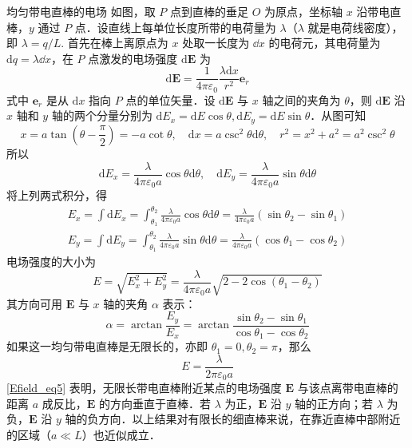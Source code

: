\begin{example}{均匀带电直棒的电场}
如图，取 $P$ 点到直棒的垂足 $O$ 为原点，坐标轴 $x$ 沿带电直棒，$y$ 通过 $P$ 点．设直线上每单位长度所带的电荷量为 $\lambda$（$\lambda$ 就是电荷线密度），即 $\lambda=q/L$. 首先在棒上离原点为 $x$ 处取一长度为 $\dd{x}$ 的电荷元，其电荷量为 $\mathrm dq=\lambda\dd{x}$，在 $P$ 点激发的电场强度 $\mathrm d\mathbf E$ 为
\begin{equation}
\mathrm{d} \mathbf{E}=\frac{1}{4 \pi \varepsilon_{0}} \frac{\lambda \mathrm{d} x}{r^{2}} \mathbf e_r
\end{equation}
式中 $\mathbf e_r$ 是从 $\mathrm dx$ 指向 $P$ 点的单位矢量．设 $\mathrm{d} \mathbf{E}$ 与 $x$ 轴之间的夹角为 $\theta$，则 $\mathrm{d} \mathbf{E}$ 沿 $x$ 轴和 $y$ 轴的两个分量分别为 $\mathrm{d} E_{x}=\mathrm{d} E \cos \theta, \mathrm{d} E_{y}=\mathrm{d} E \sin \theta$．从图可知
\begin{equation}
x=a \tan \left(\theta-\frac{\pi}{2}\right)=-a \cot \theta, \quad \mathrm{d} x=a \csc ^{2} \theta \mathrm{d} \theta, \quad r^{2}=x^{2}+a^{2}=a^{2} \csc ^{2} \theta
\end{equation}
所以
\begin{equation}
\mathrm{d} E_{x}=\frac{\lambda}{4 \pi \varepsilon_{0} a} \cos \theta \mathrm{d} \theta, \quad \mathrm{d} E_{y}=\frac{\lambda}{4 \pi \varepsilon_{0} a} \sin \theta \mathrm{d} \theta
\end{equation}
将上列两式积分，得
\begin{equation}
\begin{aligned}E_{x}=\int \mathrm{d} E_{x}=\int_{\theta_{1}}^{\theta_{2}} \frac{\lambda}{4 \pi \varepsilon_{0} a} \cos \theta \mathrm{d} \theta=\frac{\lambda}{4 \pi \varepsilon_{0} a}\left(\sin \theta_{2}-\sin \theta_{1}\right) \\ E_{y}=\int \mathrm{d} E_{y}=\int_{\theta_{1}}^{\theta_{2}} \frac{\lambda}{4 \pi \varepsilon_{0} a} \sin \theta \mathrm{d} \theta=\frac{\lambda}{4 \pi \varepsilon_{0} a}\left(\cos \theta_{1}-\cos \theta_{2}\right)\end{aligned}
\end{equation}
电场强度的大小为
\begin{equation}
E=\sqrt{E_{x}^{2}+E_{y}^{2}}=\frac{\lambda}{4 \pi \varepsilon_{0} a} \sqrt{2-2 \cos \left(\theta_{1}-\theta_{2}\right)}
\end{equation}
其方向可用 $\mathbf E$ 与 $x$ 轴的夹角 $\alpha$ 表示：
\begin{equation}
\alpha=\arctan \frac{E_{y}}{E_{x}}=\arctan \frac{\sin \theta_{2}-\sin \theta_{1}}{\cos \theta_{1}-\cos \theta_{2}}
\end{equation}
如果这一均匀带电直棒是无限长的，亦即 $\theta_{1}=0, \theta_{2}=\pi$，那么
\begin{equation} \label{Efield_eq5}
E=\frac{\lambda}{2 \pi \varepsilon_{0} a}
\end{equation}
\autoref{Efield_eq5} 表明，无限长带电直棒附近某点的电场强度 $\mathbf E$ 与该点离带电直棒的距离 $a$ 成反比，$\mathbf  E$ 的方向垂直于直棒．若 $\lambda$ 为正，$\mathbf E$ 沿 $y$ 轴的正方向；若 $\lambda$ 为负，$\mathbf E$ 沿 $y$ 轴的负方向．以上结果对有限长的细直棒来说，在靠近直棒中部附近的区域（$a\ll L$）也近似成立．
\end{example}



